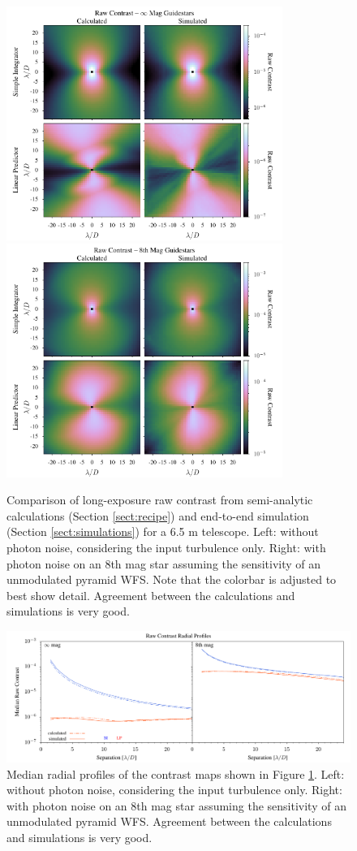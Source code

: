 \documentclass[10pt,preprint]{aastex631}
\begin{document}
\begin{figure}
\hspace{-0.3in}
\includegraphics[width=3.54in]{contrast0mag.pdf}
\includegraphics[width=3.54in]{contrast8mag.pdf}
\caption{Comparison of long-exposure raw contrast from semi-analytic calculations (Section \ref{sect:recipe}) and end-to-end simulation (Section \ref{sect:simulations}) for a 6.5 m telescope. Left: without photon noise, considering the input turbulence only.  Right: with photon noise on an 8th mag star assuming the sensitivity of an unmodulated pyramid WFS. Note that the colorbar is adjusted to best show detail.  Agreement between the calculations and simulations is very good.\label{fig:contrast_2Dcomp}}
\end{figure}

\begin{figure}
\hspace{-0.3in}
\includegraphics[width=6.5in]{contrastRP.pdf}
\caption{Median radial profiles of the contrast maps shown in Figure \ref{fig:contrast_2Dcomp}.  Left: without photon noise, considering the input turbulence only.  Right: with photon noise on an 8th mag star assuming the sensitivity of an unmodulated pyramid WFS. Agreement between the calculations and simulations is very good.\label{fig:contrast_radprof}}
\end{figure}
\end{document}
